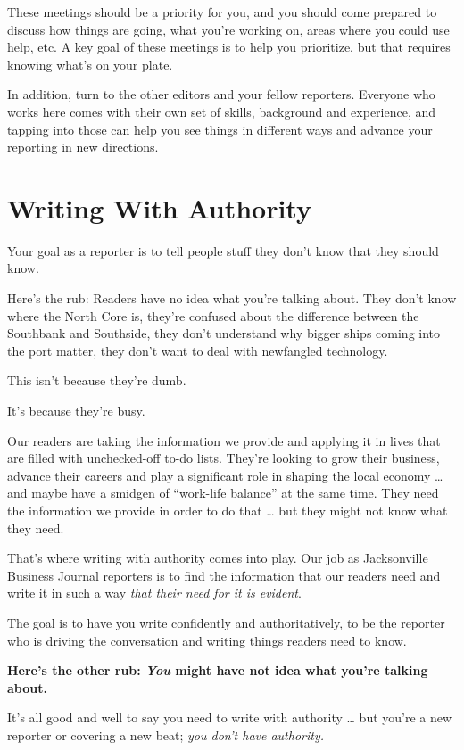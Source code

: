 \documentclass[
  11pt,
  american,
  letterpaperpaper,
  extrafontsizes,onecolumn,openright
  ]{memoir}
\begin{document}
These meetings should be a priority for you, and you should come prepared to discuss how things are going, what you're working on, areas where you could use help, etc. A key goal of these meetings is to help you prioritize, but that requires knowing what's on your plate.

In addition, turn to the other editors and your fellow reporters. Everyone who works here comes with their own set of skills, background and experience, and tapping into those can help you see things in different ways and advance your reporting in new directions.

\hypertarget{writing-with-authority}{%
\chapter{Writing With Authority}\label{writing-with-authority}}

Your goal as a reporter is to tell people stuff they don't know that they should know.

Here's the rub: Readers have no idea what you're talking about. They don't know where the North Core is, they're confused about the difference between the Southbank and Southside, they don't understand why bigger ships coming into the port matter, they don't want to deal with newfangled technology.

This isn't because they're dumb.

It's because they're busy.

Our readers are taking the information we provide and applying it in lives that are filled with unchecked-off to-do lists. They're looking to grow their business, advance their careers and play a significant role in shaping the local economy \ldots{} and maybe have a smidgen of \enquote{work-life balance} at the same time. They need the information we provide in order to do that \ldots{} but they might not know what they need.

That's where writing with authority comes into play. Our job as Jacksonville Business Journal reporters is to find the information that our readers need and write it in such a way \emph{that their need for it is evident}.

The goal is to have you write confidently and authoritatively, to be the reporter who is driving the conversation and writing things readers need to know.

\textbf{Here's the other rub: \emph{You} might have not idea what you're talking about.}

It's all good and well to say you need to write with authority \ldots{} but you're a new reporter or covering a new beat; \emph{you don't have authority.}
\end{document}
